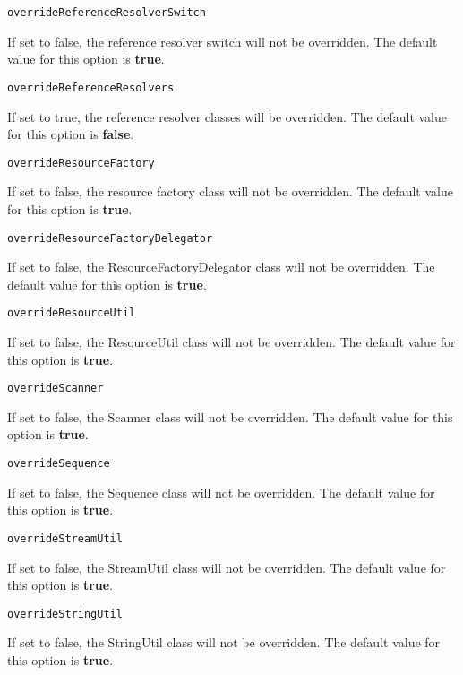 \noindent\texttt{overrideReferenceResolverSwitch}
\begin{myindentpar}{1cm}
If set to false, the reference resolver switch will not be overridden. The default value for this option is \textbf{true}.
\end{myindentpar}

\noindent\texttt{overrideReferenceResolvers}
\begin{myindentpar}{1cm}
If set to true, the reference resolver classes will be overridden. The default value for this option is \textbf{false}.
\end{myindentpar}

\noindent\texttt{overrideResourceFactory}
\begin{myindentpar}{1cm}
If set to false, the resource factory class will not be overridden. The default value for this option is \textbf{true}.
\end{myindentpar}

\noindent\texttt{overrideResourceFactoryDelegator}
\begin{myindentpar}{1cm}
If set to false, the ResourceFactoryDelegator class will not be overridden. The default value for this option is \textbf{true}.
\end{myindentpar}

\noindent\texttt{overrideResourceUtil}
\begin{myindentpar}{1cm}
If set to false, the ResourceUtil class will not be overridden. The default value for this option is \textbf{true}.
\end{myindentpar}

\noindent\texttt{overrideScanner}
\begin{myindentpar}{1cm}
If set to false, the Scanner class will not be overridden. The default value for this option is \textbf{true}.
\end{myindentpar}

\noindent\texttt{overrideSequence}
\begin{myindentpar}{1cm}
If set to false, the Sequence class will not be overridden. The default value for this option is \textbf{true}.
\end{myindentpar}

\noindent\texttt{overrideStreamUtil}
\begin{myindentpar}{1cm}
If set to false, the StreamUtil class will not be overridden. The default value for this option is \textbf{true}.
\end{myindentpar}

\noindent\texttt{overrideStringUtil}
\begin{myindentpar}{1cm}
If set to false, the StringUtil class will not be overridden. The default value for this option is \textbf{true}.
\end{myindentpar}

